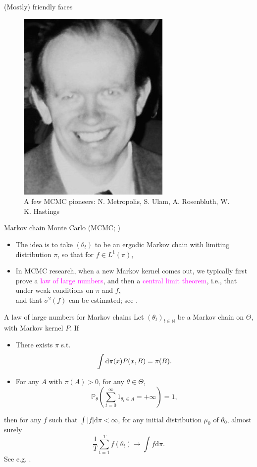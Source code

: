 \documentclass[10pt]{beamer}
\let\oldcitep=\citep
\renewcommand\citep[1]{\hyperlink{#1}{\textcolor{vert}{\oldcitep{#1}}}}
\renewcommand\un[1]{\textcolor{magenta}{#1}}
\begin{document}
\begin{frame}{(Mostly) friendly faces}
\begin{figure}
  \includegraphics[height=.3\textheight]{Figures/hastings}
  \caption{A few MCMC pioneers: N. Metropolis, S. Ulam, A. Rosenbluth, W. K. Hastings}
\end{figure}\end{frame}

\begin{frame}{Markov chain Monte Carlo (MCMC; \citep{RoCa04})}
\begin{itemize}
  \item The idea is to take $(\theta_t)$ to be an ergodic Markov chain with limiting distribution $\pi$, so that for $f\in L^1(\pi)$,
  $$$$
  \vfill
  \item In MCMC research, when a new Markov kernel comes out, we typically first prove a \un{law of large numbers}, and then a \un{central limit theorem}, i.e., that under weak conditions on $\pi$ and $f$,
  $$$$
  \vfill
  and that $\sigma^2(f)$ can be estimated; see \citep{DoMoSt14}.
  \end{itemize}
\end{frame}

\begin{frame}{A law of large numbers for Markov chains}
  Let $(\theta_t)_{t\in\mathbb N}$ be a Markov chain on $\Theta$, with Markov kernel $P$. If
  \begin{itemize}
    \item There exists $\pi$ s.t. 
    $$
    \int {\rm d}\pi(x) P(x, B) = \pi(B).
    $$
    \item For any $A$ with $\pi(A)>0$, for any $\theta\in \Theta$,
    $$ 
    \mathbb{P}_{\theta} \left(\sum_{t=0}^\infty 1_{\theta_t\in A} = +\infty\right) = 1,
    $$
  \end{itemize}
  then for any $f$ such that $\int \vert f\vert \mathrm{d} \pi <\infty$, for any initial distribution $\mu_0$ of $\theta_0$, almost surely
  $$
  \frac{1}{T} \sum_{t=1}^T f(\theta_t) \rightarrow \int f\mathrm{d}\pi.
  $$
  See e.g. \citep{DoMoSt14}.
\end{frame}
\end{document}
